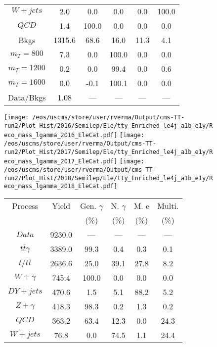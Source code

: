 \begin{figure}
\begin{minipage}[c]{0.32\textwidth}
{\begin{tabular}{cccccc}
$ W+jets $ &  2.0 &  0.0 &  0.0 &  0.0 &  100.0\\
$ QCD $ &  1.4 &  100.0 &  0.0 &  0.0 &  0.0\\
Bkgs &  1315.6 &  68.6 &  16.0 &  11.3 &  4.1\\
$ m_{T} = 800 $ &  7.3 &  0.0 &  100.0 &  0.0 &  0.0\\
$ m_{T} = 1200 $ &  0.2 &  0.0 &  99.4 &  0.0 &  0.6\\
$ m_{T} = 1600 $ &  0.0 &  -0.1 &  100.1 &  0.0 &  0.0\\
Data/Bkgs &  1.08 &  --- &  --- &  --- &  ---\\
\hline
\end{tabular}
}
\end{minipage}
\end{figure}

\begin{figure}
\centering
\texttt{[image: /eos/uscms/store/user/rverma/Output/cms-TT-run2/Plot\_Hist/2016/Semilep/Ele/tty\_Enriched\_le4j\_a1b\_e1y/Reco\_mass\_lgamma\_2016\_EleCat.pdf]}
\texttt{[image: /eos/uscms/store/user/rverma/Output/cms-TT-run2/Plot\_Hist/2017/Semilep/Ele/tty\_Enriched\_le4j\_a1b\_e1y/Reco\_mass\_lgamma\_2017\_EleCat.pdf]}
\texttt{[image: /eos/uscms/store/user/rverma/Output/cms-TT-run2/Plot\_Hist/2018/Semilep/Ele/tty\_Enriched\_le4j\_a1b\_e1y/Reco\_mass\_lgamma\_2018\_EleCat.pdf]}
\begin{minipage}[c]{0.32\textwidth}
\centering
\tiny{
\begin{tabular}{cccccc}
\hline
Process & Yield & Gen. $\gamma$ & N. $\gamma$ & M. e & Multi. \\
 &  & (\%) & (\%) & (\%) & (\%)  \\
\hline
                                                                      $ Data $ &  9230.0 &  --- &  --- &  --- &  ---\\
$ t\bar{t}\gamma $ &  3389.0 &  99.3 &  0.4 &  0.3 &  0.1\\
$ t/t\bar{t} $ &  2636.6 &  25.0 &  39.1 &  27.8 &  8.2\\
$ W+\gamma $ &  745.4 &  100.0 &  0.0 &  0.0 &  0.0\\
$ DY+jets $ &  470.6 &  1.5 &  5.1 &  88.2 &  5.2\\
$ Z+\gamma $ &  418.3 &  98.3 &  0.2 &  1.3 &  0.2\\
$ QCD $ &  363.2 &  63.4 &  12.3 &  0.0 &  24.3\\
$ W+jets $ &  76.8 &  0.0 &  74.5 &  1.1 &  24.4\\

\end{tabular}}
\end{minipage}
\end{figure}
